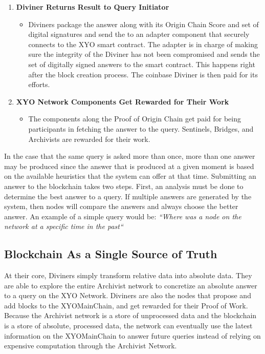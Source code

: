 \documentclass{article}
\begin{document}
\begin{enumerate}
\begin{itemize}
  \end{itemize}
  \item \textbf{Diviner Returns Result to Query Initiator}
  \begin{itemize}
    \item Diviners package the answer along with its Origin Chain Score and set of digital signatures and send the to an adapter component that securely connects to the XYO smart contract. The adapter is in charge of making sure the integrity of the Diviner has not been compromised and sends the set of digitally signed answers to the smart contract. This happens right after the block creation process. The coinbase Diviner is then paid for its efforts.
  \end{itemize}
  \item \textbf{XYO Network Components Get Rewarded for Their Work}
  \begin{itemize}
    \item The components along the Proof of Origin Chain get paid for being participants in fetching the answer to the query. Sentinels, Bridges, and Archivists are rewarded for their work.
  \end{itemize}
\end{enumerate}
In the case that the same query is asked more than once, more than one answer may be produced since the answer that is produced at a given moment is based on the available heuristics that the system can offer at that time.
Submitting an answer to the blockchain takes two steps. First, an analysis must be done to determine the best answer to a query. If multiple answers are generated by the system, then nodes will compare the answers and always choose the better answer. An example of a simple query would be: \textit{``Where was a node on the network at a specific time in the past``}

\subsection{Blockchain As a Single Source of Truth}

At their core, Diviners simply transform relative data into absolute data. They are able to explore the entire Archivist network to concretize an absolute answer to a query on the XYO Network. Diviners are also the nodes that propose and add blocks to the XYOMainChain, and get rewarded for their Proof of Work. Because the Archivist network is a store of unprocessed data and the blockchain is a store of absolute, processed data, the network can eventually use the latest information on the XYOMainChain to answer future queries instead of relying on expensive computation through the Archivist Network.
\end{document}
